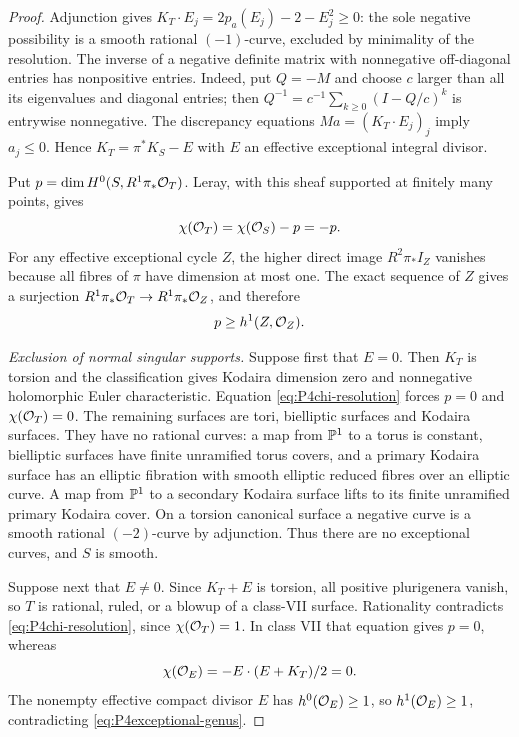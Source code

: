 \begin{proof}
Adjunction gives
$K_T\cdot E_j=2p_a(E_j)-2-E_j^2\ge0$: the sole negative
possibility is a smooth rational $(-1)$-curve, excluded by
minimality of the resolution. The inverse of a negative definite
matrix with nonnegative off-diagonal entries has nonpositive
entries. Indeed, put $Q=-M$ and choose $c$ larger than all its
eigenvalues and diagonal entries; then
$Q^{-1}=c^{-1}\sum_{k\ge0}(I-Q/c)^k$ is entrywise nonnegative.
The discrepancy equations $Ma=(K_T\cdot E_j)_j$ imply
$a_j\le0$. Hence $K_T=\pi^*K_S-E$ with $E$ an effective
exceptional integral divisor.

Put $p=\dim H^0(S,R^1\pi_*\mathcal O_T)$. Leray, with this sheaf
supported at finitely many points, gives
\begin{equation}\label{eq:P4chi-resolution}
 \chi(\mathcal O_T)=\chi(\mathcal O_S)-p=-p.
\end{equation}
For any effective exceptional cycle $Z$, the higher direct image
$R^2\pi_*I_Z$ vanishes because all fibres of $\pi$ have dimension
at most one. The exact sequence of $Z$ gives a surjection
$R^1\pi_*\mathcal O_T\to R^1\pi_*\mathcal O_Z$, and therefore
\begin{equation}\label{eq:P4exceptional-genus}
 p\ge h^1(Z,\mathcal O_Z).
\end{equation}

\emph{Exclusion of normal singular supports.}
Suppose first that $E=0$. Then $K_T$ is torsion and the
classification gives Kodaira dimension zero and nonnegative
holomorphic Euler characteristic. Equation
\eqref{eq:P4chi-resolution} forces $p=0$ and $\chi(\mathcal O_T)=0$.
The remaining surfaces are tori, bielliptic surfaces and Kodaira
surfaces. They have no rational curves: a map from $\mathbb P^1$ to
a torus is constant, bielliptic surfaces have finite unramified
torus covers, and a primary Kodaira surface has an elliptic
fibration with smooth elliptic reduced fibres over an elliptic
curve. A map from $\mathbb P^1$ to a secondary Kodaira surface lifts
to its finite unramified primary Kodaira cover. On a torsion
canonical surface a negative curve is a smooth rational
$(-2)$-curve by adjunction. Thus there are no exceptional
curves, and $S$ is smooth.

Suppose next that $E\ne0$. Since $K_T+E$ is torsion, all
positive plurigenera vanish, so $T$ is rational, ruled, or a
blowup of a class-VII surface. Rationality contradicts
\eqref{eq:P4chi-resolution}, since $\chi(\mathcal O_T)=1$. In class
VII that equation gives $p=0$, whereas
\[
 \chi(\mathcal O_E)=-E\cdot(E+K_T)/2=0.
\]
The nonempty effective compact divisor $E$ has $h^0(\mathcal O_E)\ge1$,
so $h^1(\mathcal O_E)\ge1$, contradicting
\eqref{eq:P4exceptional-genus}.


\end{proof}
